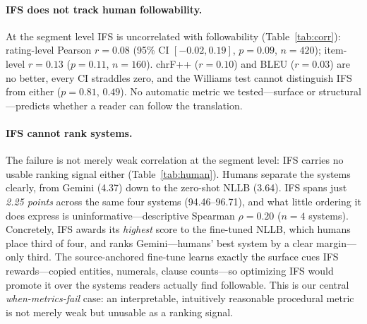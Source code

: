 \documentclass[11pt]{article}
\begin{document}
\paragraph{IFS does not track human followability.} At the segment level IFS is uncorrelated
with followability (Table~\ref{tab:corr}): rating-level Pearson $r{=}0.08$ (95\% CI
$[-0.02, 0.19]$, $p{=}0.09$, $n{=}420$); item-level $r{=}0.13$ ($p{=}0.11$, $n{=}160$). chrF++
($r{=}0.10$) and BLEU ($r{=}0.03$) are no better, every CI straddles zero, and the Williams test
cannot distinguish IFS from either ($p{=}0.81$, $0.49$). No automatic metric we tested---surface
or structural---predicts whether a reader can follow the translation.



\paragraph{IFS cannot rank systems.} The failure is not merely weak correlation at the segment
level: IFS carries no usable ranking signal either (Table~\ref{tab:human}). Humans separate the
systems clearly, from Gemini (4.37) down to the zero-shot NLLB (3.64). IFS spans just
\emph{2.25 points} across the same four systems (94.46--96.71), and what little ordering it does
express is uninformative---descriptive Spearman $\rho{=}0.20$ ($n{=}4$ systems). Concretely, IFS
awards its \emph{highest} score to the fine-tuned NLLB, which humans place third of four, and
ranks Gemini---humans' best system by a clear margin---only third. The source-anchored fine-tune
learns exactly the surface cues IFS rewards---copied entities, numerals, clause counts---so
optimizing IFS would promote it over the systems readers actually find followable. This is our
central \emph{when-metrics-fail} case: an interpretable, intuitively reasonable procedural metric
is not merely weak but unusable as a ranking signal.


\end{document}
